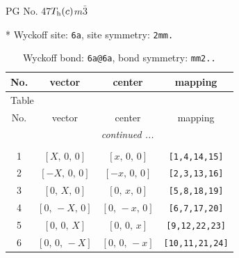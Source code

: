 \documentclass[fleqn,8pt]{jsarticle}
\begin{document}
\setcounter{MaxMatrixCols}{32}

\renewcommand{\tablename}{Table~}
\renewcommand{\figurename}{Figure~}
\begin{center}
\LARGE
PG No. 47\quad$T_{\rm h}(c)$\quad$m\bar{3}$\quad[ cubic ]
\end{center}


* Wyckoff site: {\tt 6a}, site symmetry: {\tt 2mm.}
\renewcommand{\arraystretch}{1.2}
\begin{longtable}{cccc}
\caption{Wyckoff bond: {\tt 6a@6a}, bond symmetry: {\tt mm2..}}
 \\
 \hline \hline
No. & vector & center & mapping \\ \hline \endfirsthead

\multicolumn{3}{l}{\tablename\ \thetable{}} \\
 \hline \hline
No. & vector & center & mapping \\ \hline \endhead

 \hline \hline
\multicolumn{3}{r}{\footnotesize\it continued ...} \\ \endfoot

 \hline \hline
\multicolumn{3}{r}{} \\ \endlastfoot

1 & $\left[ X,\, 0,\, 0 \right]$ & $\left[ x,\, 0,\, 0 \right]$ & {\tt [1,4,14,15]} \\ \hline
2 & $\left[ - X,\, 0,\, 0 \right]$ & $\left[ - x,\, 0,\, 0 \right]$ & {\tt [2,3,13,16]} \\ \hline
3 & $\left[ 0,\, X,\, 0 \right]$ & $\left[ 0,\, x,\, 0 \right]$ & {\tt [5,8,18,19]} \\ \hline
4 & $\left[ 0,\, - X,\, 0 \right]$ & $\left[ 0,\, - x,\, 0 \right]$ & {\tt [6,7,17,20]} \\ \hline
5 & $\left[ 0,\, 0,\, X \right]$ & $\left[ 0,\, 0,\, x \right]$ & {\tt [9,12,22,23]} \\ \hline
6 & $\left[ 0,\, 0,\, - X \right]$ & $\left[ 0,\, 0,\, - x \right]$ & {\tt [10,11,21,24]} \\
\end{longtable}
\renewcommand{\arraystretch}{1.2}
\end{document}
